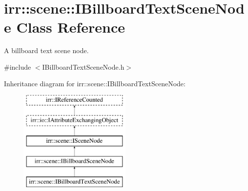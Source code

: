 \hypertarget{classirr_1_1scene_1_1IBillboardTextSceneNode}{}\section{irr\+:\+:scene\+:\+:I\+Billboard\+Text\+Scene\+Node Class Reference}
\label{classirr_1_1scene_1_1IBillboardTextSceneNode}


A billboard text scene node.  




{\ttfamily \#include $<$I\+Billboard\+Text\+Scene\+Node.\+h$>$}

Inheritance diagram for irr\+:\+:scene\+:\+:I\+Billboard\+Text\+Scene\+Node\+:\begin{figure}[H]
\begin{center}
\leavevmode
\includegraphics[height=5.000000cm]{classirr_1_1scene_1_1IBillboardTextSceneNode}
\end{center}
\end{figure}
